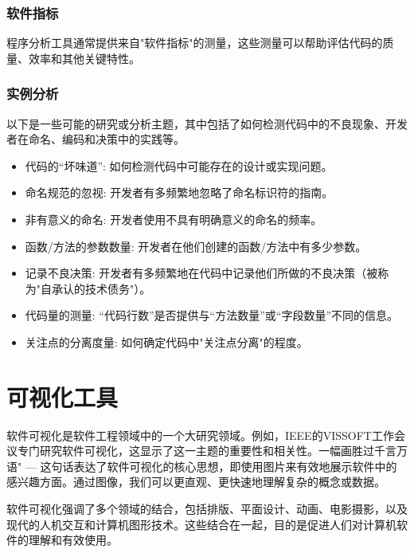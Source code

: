 \subsubsection{软件指标}
程序分析工具通常提供来自"软件指标"的测量，这些测量可以帮助评估代码的质量、效率和其他关键特性。

\subsubsection{实例分析}
以下是一些可能的研究或分析主题，其中包括了如何检测代码中的不良现象、开发者在命名、编码和决策中的实践等。
\begin{itemize}
	\item 代码的“坏味道”: 如何检测代码中可能存在的设计或实现问题。
	\item 命名规范的忽视: 开发者有多频繁地忽略了命名标识符的指南。
	\item 非有意义的命名: 开发者使用不具有明确意义的命名的频率。
	\item 函数/方法的参数数量: 开发者在他们创建的函数/方法中有多少参数。
	\item 记录不良决策: 开发者有多频繁地在代码中记录他们所做的不良决策（被称为"自承认的技术债务"）。
	\item 代码量的测量: “代码行数”是否提供与“方法数量”或“字段数量”不同的信息。
	\item 关注点的分离度量: 如何确定代码中"关注点分离"的程度。
\end{itemize}



\section{可视化工具}
软件可视化是软件工程领域中的一个大研究领域。例如，IEEE的VISSOFT工作会议专门研究软件可视化，这显示了这一主题的重要性和相关性。一幅画胜过千言万语" — 这句话表达了软件可视化的核心思想，即使用图片来有效地展示软件中的感兴趣方面。通过图像，我们可以更直观、更快速地理解复杂的概念或数据。

软件可视化强调了多个领域的结合，包括排版、平面设计、动画、电影摄影，以及现代的人机交互和计算机图形技术。这些结合在一起，目的是促进人们对计算机软件的理解和有效使用。











